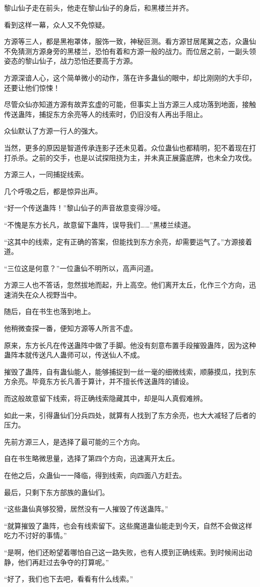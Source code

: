 \begin{this_body}
黎山仙子走在前头，他走在黎山仙子的身后，和黑楼兰并齐。

看到这样一幕，众人又不免惊疑。

方源等三人，都是黑袍罩体，服饰一致，神秘叵测。看方源甘居尾翼之态，众蛊仙不免猜测方源身旁的黑楼兰，恐怕有着和方源一般的战力。而位居之前，一副头领姿态的黎山仙子，战力恐怕还要高于方源。

方源深谙人心，这个简单微小的动作，落在许多蛊仙的眼中，却比刚刚的大手印，还要让他们惊悚！

尽管众仙亦知道方源有故弄玄虚的可能，但事实上当方源三人成功落到地面，接触传送蛊阵，捕捉东方余亮等人的线索时，仍旧没有人再出手阻止。

众仙默认了方源一行人的强大。

当然，更多的原因是智道传承连影子还未见着。众位蛊仙也都精明，犯不着现在打打杀杀。之前的交手，也是以试探阻挠为主，并未真正展露底牌，也未全力攻伐。

方源三人，一同捕捉线索。

几个呼吸之后，都是惊异出声。

“好一个传送蛊阵！”黎山仙子的声音故意变得沙哑。

“不愧是东方长凡，故意留下蛊阵，误导我们……”黑楼兰续道。

“这其中的线索，定有正确的答案，但能找到东方余亮，却需要运气了。”方源接着道。

“三位这是何意？”一位蛊仙不明所以，高声问道。

方源三人也不答话，忽然拔地而起，升上高空。他们离开太丘，化作三个方向，迅速消失在众人视野当中。

随后，自在书生也落到地上。

他稍微查探一番，便知方源等人所言不虚。

原来，东方长凡在传送蛊阵中做了手脚。他没有刻意布置手段摧毁蛊阵，因为这种蛊阵本就传送凡人蛊师可以，传送仙人不成。

摧毁了蛊阵，自有蛊仙能人，能够捕捉到一丝一毫的细微线索，顺藤摸瓜，找到东方余亮。毕竟东方长凡善于算计，并不擅长传送蛊阵的铺设。

而这般故意留下线索，将正确线索隐藏其中，却是叫人真假难辨。

如此一来，引得蛊仙们分兵四处，就算有人找到了东方余亮，也大大减轻了后者的压力。

先前方源三人，是选择了最可能的三个方向。

自在书生略微思量，选择了第四个方向，迅速离开太丘。

在他之后，众蛊仙一一降临，得到线索，向四面八方赶去。

最后，只剩下东方部族的蛊仙们。

“这些蛊仙真够狡猾，居然没有一人摧毁了传送蛊阵。”

“就算摧毁了蛊阵，也会有线索留下。这些魔道蛊仙能走到今天，自然不会做这样吃力不讨好的事情。”

“是啊，他们还盼望着哪怕自己这一路失败，也有人摸到正确线索。到时候闹出动静，他们再赶过去争夺的打算呢。”

“好了，我们也下去吧，看看有什么线索。”

\end{this_body}

